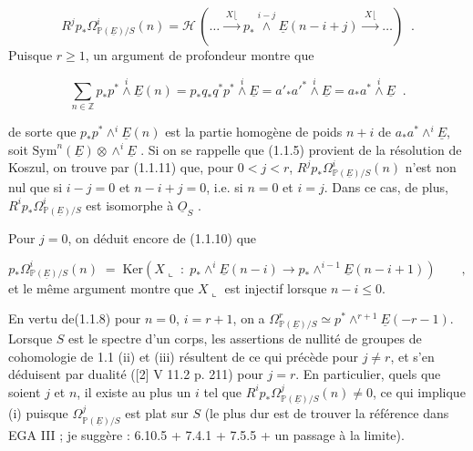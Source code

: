 \begin{equation}\tag{1.1.11}
R^j p_* \Omega^i_{\mathbb{P}(\underline{E})/S}(n) = \mathcal{H} \, ( \ldots \xrightarrow{\;X\lfloor\;} p_* \overset{i-j}{\wedge} \underline{E}(n-i+j) \xrightarrow{\;X\lfloor\;} \ldots ) \;\; .
\end{equation}
Puisque $r \geq 1$, un argument de profondeur montre que

\begin{equation}\tag{1.1.12}
\sum_{n \in \mathbb{Z}} p_*p^* \overset{i}{\wedge} \underline{E}(n) = p_*q_*q^*p^* \overset{i}{\wedge} \underline{E} = {a'}_{*}{a'}^{*} \overset{i}{\wedge} \underline{E} = a_*a^* \overset{i}{\wedge} \underline{E} \;\; .
\end{equation}


 de sorte que $p_*p^* \wedge^i \underline{E}(n)$ est la partie homogène de poids $n + i$ de $a_*a^* \wedge^i \underline{E}$, soit $\mathrm{Sym}^n(\underline{E}) \otimes \wedge^i \underline{E}$ . Si on se rappelle que (1.1.5) provient de la résolution de Koszul, on trouve par (1.1.11) que, pour $0 < j < r$, $R^j p_* \Omega^i_{\mathbb{P}(\underline{E})/S}(n)$ n'est non nul que si $i-j = 0$ et $n-i+j = 0$, i.e. si $n = 0$ et $i = j$. Dans ce cas, de plus, $R^i p_* \Omega^i_{\mathbb{P}(\underline{E})/S}$ est isomorphe à $\underline{O}_S$ .

Pour $j = 0$, on déduit encore de (1.1.10) que

\begin{equation}\tag{1.1.13}
p_*\Omega^i_{\mathbb{P}(\underline{E})/S}(n) \;=\; \mathrm{Ker}(X \llcorner \;:\; p_* \wedge^i \underline{E}(n-i) \longrightarrow p_* \wedge^{i-1} \underline{E}(n-i+1)) \qquad ,
\end{equation}
et le même argument montre que $X \llcorner$ est injectif lorsque $n-i \leq 0$.

En vertu de(1.1.8) pour $n = 0$, $i = r+1$, on a $\Omega^r_{\mathbb{P}(\underline{E})/S} \simeq p^* \wedge^{r+1} \underline{E}(-r-1)$. Lorsque $S$ est le spectre d'un corps, les assertions de nullité de groupes de cohomologie de 1.1 (ii) et (iii) résultent de ce qui précède pour $j \neq r$, et s'en déduisent par dualité ([2] V 11.2 p. 211) pour $j = r$. En particulier, quels que soient $j$ et $n$, il existe au plus un $i$ tel que $R^i p_* \Omega^j_{\mathbb{P}(\underline{E})/S}(n) \neq 0$, ce qui implique (i) puisque $\Omega^j_{\mathbb{P}(\underline{E})/S}$ est plat sur $S$ (le plus dur est de trouver la référence dans EGA III ; je suggère : 6.10.5 + 7.4.1 + 7.5.5 + un passage à la limite).

